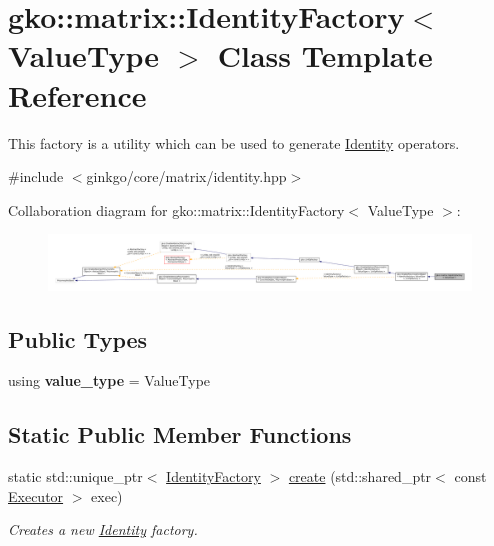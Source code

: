 \hypertarget{classgko_1_1matrix_1_1IdentityFactory}{}\section{gko\+:\+:matrix\+:\+:Identity\+Factory$<$ Value\+Type $>$ Class Template Reference}
\label{classgko_1_1matrix_1_1IdentityFactory}


This factory is a utility which can be used to generate \hyperlink{classgko_1_1matrix_1_1Identity}{Identity} operators.  




{\ttfamily \#include $<$ginkgo/core/matrix/identity.\+hpp$>$}



Collaboration diagram for gko\+:\+:matrix\+:\+:Identity\+Factory$<$ Value\+Type $>$\+:
\nopagebreak
\begin{figure}[H]
\begin{center}
\leavevmode
\includegraphics[width=350pt]{classgko_1_1matrix_1_1IdentityFactory__coll__graph}
\end{center}
\end{figure}
\subsection*{Public Types}
\begin{DoxyCompactItemize}
\item 
\mbox{\label{classgko_1_1matrix_1_1IdentityFactory_a4af7caf18cf65cbbdc6882368f2577e2}} 
using {\bfseries value\+\_\+type} = Value\+Type
\end{DoxyCompactItemize}
\subsection*{Static Public Member Functions}
\begin{DoxyCompactItemize}
\item 
static std\+::unique\+\_\+ptr$<$ \hyperlink{classgko_1_1matrix_1_1IdentityFactory}{Identity\+Factory} $>$ \hyperlink{classgko_1_1matrix_1_1IdentityFactory_a653ce1d7377e69643828b9c46b4d0319}{create} (std\+::shared\+\_\+ptr$<$ const \hyperlink{classgko_1_1Executor}{Executor} $>$ exec)
\begin{DoxyCompactList}\small\item\em Creates a new \hyperlink{classgko_1_1matrix_1_1Identity}{Identity} factory. \end{DoxyCompactList}\end{DoxyCompactItemize}

